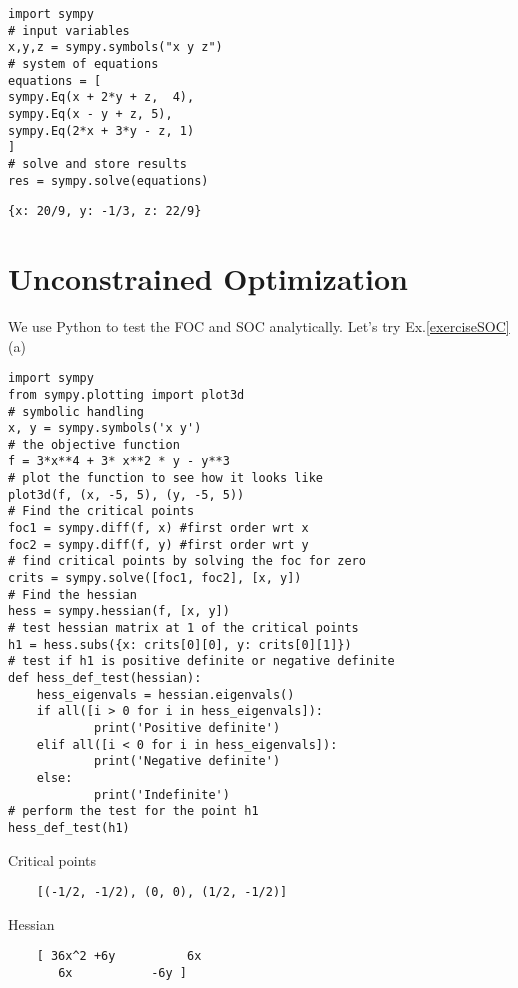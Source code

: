 \documentclass[10pt,a4paper]{book}
\theoremstyle{definition}\newtheorem{definition}{Definition}
\theoremstyle{definition}\newtheorem{fact}{Fact}
\theoremstyle{definition}\newtheorem{ex}{Ex.}
\theoremstyle{definition}\newtheorem{project}{Project}
\theoremstyle{definition}\newtheorem{problem}{Problem}
\theoremstyle{definition}\newtheorem{example}{Example}
\numberwithin{theorem}{chapter}
\numberwithin{corollary}{chapter}
\numberwithin{assumption}{chapter}
\numberwithin{definition}{chapter}
\numberwithin{prop}{chapter}
\numberwithin{notation}{chapter}
\numberwithin{problem}{chapter}
\numberwithin{example}{chapter}
\numberwithin{fact}{chapter}
\numberwithin{ex}{chapter}
\begin{document}
	\begin{framed}
	\begin{verbatim}
import sympy
# input variables
x,y,z = sympy.symbols("x y z")
# system of equations
equations = [
sympy.Eq(x + 2*y + z,  4),
sympy.Eq(x - y + z, 5),
sympy.Eq(2*x + 3*y - z, 1)
]
# solve and store results
res = sympy.solve(equations)
	\end{verbatim}
\end{framed}

\begin{verbatim}
{x: 20/9, y: -1/3, z: 22/9}
\end{verbatim}
	
	\section{Unconstrained Optimization}
	We use Python to test the FOC and SOC analytically. Let's try Ex.\ref{exerciseSOC} (a)
\begin{framed}	
	\begin{verbatim}
import sympy
from sympy.plotting import plot3d
# symbolic handling
x, y = sympy.symbols('x y')
# the objective function
f = 3*x**4 + 3* x**2 * y - y**3
# plot the function to see how it looks like
plot3d(f, (x, -5, 5), (y, -5, 5))
# Find the critical points
foc1 = sympy.diff(f, x) #first order wrt x
foc2 = sympy.diff(f, y) #first order wrt y
# find critical points by solving the foc for zero
crits = sympy.solve([foc1, foc2], [x, y])
# Find the hessian
hess = sympy.hessian(f, [x, y])
# test hessian matrix at 1 of the critical points
h1 = hess.subs({x: crits[0][0], y: crits[0][1]})
# test if h1 is positive definite or negative definite
def hess_def_test(hessian):
    hess_eigenvals = hessian.eigenvals()
    if all([i > 0 for i in hess_eigenvals]):
        	print('Positive definite')
    elif all([i < 0 for i in hess_eigenvals]):
        	print('Negative definite')
    else:
        	print('Indefinite')
# perform the test for the point h1
hess_def_test(h1)
	\end{verbatim}
\end{framed}

Critical points 
\begin{verbatim}
	[(-1/2, -1/2), (0, 0), (1/2, -1/2)]
\end{verbatim}

Hessian
\begin{verbatim}
	[ 36x^2 +6y          6x
	   6x           -6y ]
\end{verbatim}
\end{document}
